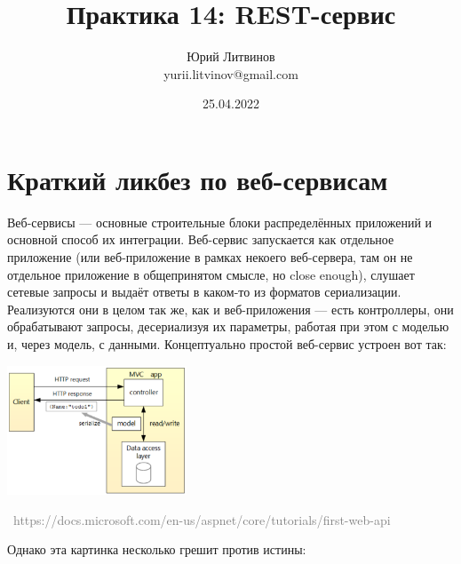 \documentclass[a5paper]{article}
\title{Практика 14: REST-сервис}
\author{Юрий Литвинов\\\small{yurii.litvinov@gmail.com}}
\date{25.04.2022}
\newcommand{\attribution}[1] {
    \vspace{-5mm}\begin{flushright}\begin{scriptsize}\textcolor{gray}{\textcopyright\, #1}\end{scriptsize}\end{flushright}
}
\begin{document}
\maketitle
\thispagestyle{empty}

\section{Краткий ликбез по веб-сервисам}

Веб-сервисы --- основные строительные блоки распределённых приложений и основной способ их интеграции. Веб-сервис запускается как отдельное приложение (или веб-приложение в рамках некоего веб-сервера, там он не отдельное приложение в общепринятом смысле, но close enough), слушает сетевые запросы и выдаёт ответы в каком-то из форматов сериализации. Реализуются они в целом так же, как и веб-приложения --- есть контроллеры, они обрабатывают запросы, десериализуя их параметры, работая при этом с моделью и, через модель, с данными. Концептуально простой веб-сервис устроен вот так:

\begin{center}
    \includegraphics[width=0.4\textwidth]{webApiServiceDesign.png}
    \attribution{https://docs.microsoft.com/en-us/aspnet/core/tutorials/first-web-api}
\end{center}

Однако эта картинка несколько грешит против истины:
\end{document}
